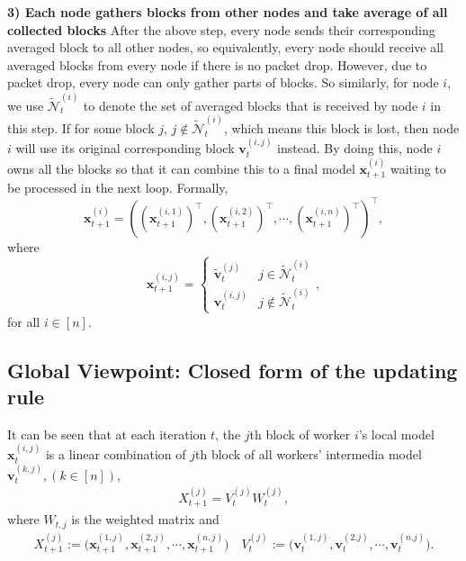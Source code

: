 \documentclass{article}
\renewcommand{\paragraph}[1]{\noindent\textbf{#1}}
\def\rc{\color{red}}
\begin{document}
\paragraph{3) Each node gathers blocks from other nodes and take average of all collected blocks} After the above step, every node sends their corresponding averaged block to all other nodes, so equivalently, every node should receive all averaged blocks from every node if there is no packet drop. However, due to packet drop, every node can only gather parts of blocks. So similarly, for node $i$, we use $\widetilde{\mathcal{N}}_t^{(i)}$ to denote the set of averaged blocks that is received by node $i$ in this step. If for some block $j$, $j\notin \widetilde{\mathcal{N}}_t^{(i)}$, which means this block is lost, then node $i$ will use its original corresponding block $\bm{v}_t^{(i,j)}$ instead. By doing this, node $i$ owns all the blocks so that it can combine this to a final model $\bm{x}_{t+1}^{(i)}$ waiting to be processed in the next loop. Formally,
\begin{equation} \label{eq: dividex}
	\bm{x}_{t+1}^{(i)} = \left(\left(\bm{x}_{t+1}^{(i,1)}\right)^{\top}, \left(\bm{x}_{t+1}^{(i,2)}\right)^{\top},\cdots, \left(\bm{x}_{t+1}^{(i,n)}\right)^{\top}\right)^{\top},
\end{equation}
where
\begin{displaymath}
	\bm{x}_{t+1}^{(i,j)} = \left\{ \begin{array}{ll}
		\tilde{\bm{v}}_t^{(j)} & j\in \widetilde{\mathcal{N}}_t^{(i)}\\
		\bm{v}_t^{(i,j)} & j\notin \widetilde{\mathcal{N}}_t^{(i)}
	\end{array} \right. ,
\end{displaymath}
for all $i\in [n]$.

\subsection{Global Viewpoint: Close{\rc d} form of the updating rule} 
It can be seen that at each iteration $t$, the $j$th block of worker $i$'s local model $\bm{x}_{t}^{(i,j)}$ is a linear combination of $j$th block of all workers' intermedia model $\bm{v}_t^{(k,j)}, (k\in [n])$,
\begin{align} \label{eq: updatingrule}
X_{t+1}^{(j)} = V_t^{(j)} W_{t}^{(j)},
\end{align}
where $W_{t,j}$ is the weighted matrix and
\begin{align*}
X_{t+1}^{(j)}:= \big(\bm{x}_{t+1}^{(1,j)}, \bm{x}_{t+1}^{(2,j)}, \cdots, \bm{x}_{t+1}^{(n,j)}\big)\quad
V_t^{(j)} := \big(\bm{v}_t^{(1,j)}, \bm{v}_t^{(2.j)}, \cdots, \bm{v}_t^{(n.j)}\big).
\end{align*}
\end{document}
